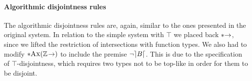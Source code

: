 \paragraph{Algorithmic disjointness rules}

The algorithmic disjointness rules are, again, similar to the ones presented in the original system.
In relation to the simple system with $\top$ we placed back $\textsc{$*$$\rightarrow$}$, since we lifted the restriction
of intersections with function types.
We also had to modify $\textsc{$* \text{Ax}(\mathbb{Z} \! \rightarrow)$}$ to include the premise $\neg \rceil B \lceil$.
This is due to the specification of $\top$-disjointness, which requires two types not to be top-like in order for them to be disjoint.



